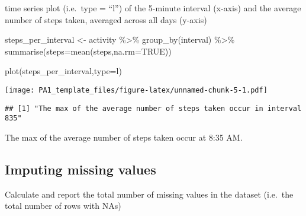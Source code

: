 \documentclass[]{article}
\newenvironment{Shaded}{\begin{snugshade}}{\end{snugshade}}
\newcommand{\AttributeTok}[1]{\textcolor[rgb]{0.77,0.63,0.00}{#1}}
\newcommand{\ConstantTok}[1]{\textcolor[rgb]{0.00,0.00,0.00}{#1}}
\newcommand{\FunctionTok}[1]{\textcolor[rgb]{0.00,0.00,0.00}{#1}}
\newcommand{\NormalTok}[1]{#1}
\newcommand{\OtherTok}[1]{\textcolor[rgb]{0.56,0.35,0.01}{#1}}
\newcommand{\SpecialCharTok}[1]{\textcolor[rgb]{0.00,0.00,0.00}{#1}}
\newcommand{\StringTok}[1]{\textcolor[rgb]{0.31,0.60,0.02}{#1}}
\begin{document}
time series plot (i.e.~type = ``l'') of the 5-minute interval (x-axis)
and the average number of steps taken, averaged across all days (y-axis)

\begin{Shaded}
\begin{Highlighting}[]
\NormalTok{steps\_per\_interval }\OtherTok{\textless{}{-}}\NormalTok{ activity }\SpecialCharTok{\%\textgreater{}\%}
  \FunctionTok{group\_by}\NormalTok{(interval) }\SpecialCharTok{\%\textgreater{}\%}
  \FunctionTok{summarise}\NormalTok{(}\AttributeTok{steps=}\FunctionTok{mean}\NormalTok{(steps,}\AttributeTok{na.rm=}\ConstantTok{TRUE}\NormalTok{))}

\FunctionTok{plot}\NormalTok{(steps\_per\_interval,}\AttributeTok{type=}\StringTok{\textquotesingle{}l\textquotesingle{}}\NormalTok{)}
\end{Highlighting}
\end{Shaded}

\texttt{[image: PA1\_template\_files/figure-latex/unnamed-chunk-5-1.pdf]}

\begin{Shaded}
\end{Shaded}

\begin{verbatim}
## [1] "The max of the average number of steps taken occur in interval 835"
\end{verbatim}

The max of the average number of steps taken occur at 8:35 AM.

\hypertarget{imputing-missing-values}{%
\subsection{Imputing missing values}\label{imputing-missing-values}}

Calculate and report the total number of missing values in the dataset
(i.e.~the total number of rows with NAs)
\end{document}
